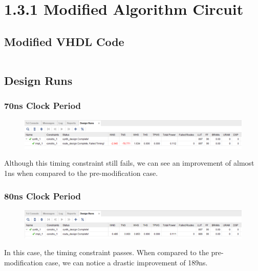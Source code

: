 \documentclass[11pt]{report}
\begin{document}
\section*{1.3.1 Modified Algorithm Circuit}
\subsection*{Modified VHDL Code}
\inputminted[firstline=23]{vhdl}{"../../Lab2/Lab2.srcs/sources_1/imports/Digital Engineering/Algorithm.vhd"}

\subsection*{Design Runs}
\subsubsection*{70ns Clock Period}
\begin{figure}[H]
    \includegraphics[width=\columnwidth]{Reports/Lab2/Waveforms/taskc_70ns_design-runs.png}
\end{figure}
Although this timing constraint still fails, we can see an improvement of almost 1ns when compared to the pre-modification case.

\subsubsection*{80ns Clock Period}
\begin{figure}[H]
    \includegraphics[width=\columnwidth]{Reports/Lab2/Waveforms/taskc_80ns_design-runs.png}
\end{figure}
In this case, the timing constraint passes. When compared to the pre-modification case, we can notice a drastic improvement of 189ns.
\end{document}
